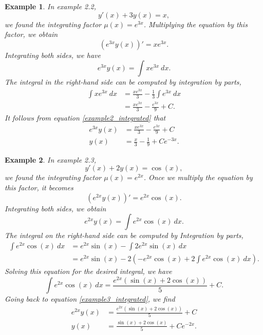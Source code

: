 \documentclass[11pt]{amsart}
\newtheorem{example}{Example}[section]
\numberwithin{equation}{section}
\begin{document}
\begin{example}
In example 2.2, 
\begin{equation*}
y'(x)+3y(x)=x,
\end{equation*}
we found the integrating factor $\mu(x)=e^{3x}$. Multiplying the equation by this factor, we obtain 
\begin{equation*}
(e^{3x}y(x))'=xe^{3x}.
\end{equation*}
Integrating both sides, we have 
\begin{equation}
\label{example2_integrated}
e^{3x}y(x)= \int xe^{3x}\ dx.
\end{equation}
The integral in the right-hand side can be computed by integration by parts, 
\begin{align*}
\int xe^{3x} \ dx & = \frac{xe^{3x}}{3}-\frac{1}{3}\int e^{3x}\ dx \\
& = \frac{xe^{3x}}{3} -\frac{e^{3x}}{9} + C.
\end{align*}
It follows from equation \eqref{example2_integrated} that
\begin{align*}
e^{3x}y(x) & =  \frac{xe^{3x}}{3} -\frac{e^{3x}}{9} + C \\
y(x) & = \frac{x}{3} -\frac{1}{9} + Ce^{-3x}.
\end{align*}
\end{example}

\begin{example}
In example 2.3, 
\begin{equation*}
y'(x)+2y(x)=\cos(x),
\end{equation*}
we found the integrating factor $\mu(x)=e^{2x}$. Once we multiply the equation by this factor, it becomes
\begin{equation*}
(e^{2x}y(x))'=e^{2x}\cos(x).
\end{equation*}
Integrating both sides, we obtain
\begin{equation}
\label{example3_integrated}
e^{2x}y(x)=\int e^{2x}\cos(x)\ dx.
\end{equation}
The integral on the right-hand side can be computed by Integration by parts, 
\begin{align*}
\int e^{2x}\cos(x)\ dx & = e^{2x}\sin(x)-\int 2e^{2x}\sin(x)\ dx \\
& = e^{2x}\sin(x)-2\left(-e^{2x}\cos(x)+2\int e^{2x} \cos(x) \ dx\right).
\end{align*}
Solving this equation for the desired integral, we have 
\begin{equation*}
\int e^{2x}\cos(x)\ dx = \frac{e^{2x}(\sin(x)+2\cos(x))}{5} + C.
\end{equation*}
Going back to equation \eqref{example3_integrated}, we find
\begin{align*}
e^{2x}y(x) & = \frac{e^{2x}(\sin(x)+2\cos(x))}{5} + C \\
y(x) & = \frac{\sin(x)+2\cos(x)}{5} + Ce^{-2x}.
\end{align*}
\end{example}
\end{document}
